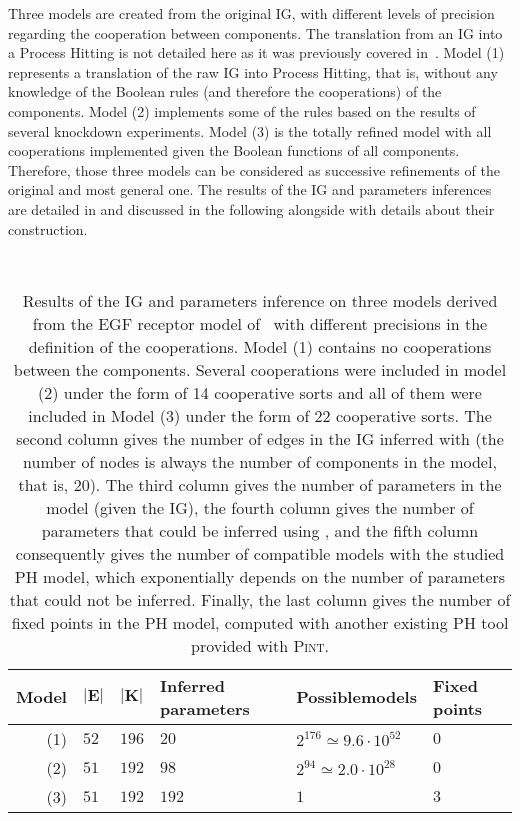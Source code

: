 Three models are created from the original IG, with different levels of precision regarding the cooperation between components.
The translation from an IG into a Process Hitting is not detailed here as it was previously covered in~\cite{PMR10-TCSB}.
Model (1) represents a translation of the raw IG into Process Hitting, that is,
without any knowledge of the Boolean rules (and therefore the cooperations) of the components.
Model (2) implements some of the rules based on the results of several knockdown experiments.
Model (3) is the totally refined model with all cooperations implemented given the Boolean functions of all components.
Therefore, those three models can be considered as successive refinements of the original and most general one.
The results of the IG and parameters inferences are detailed in 
and discussed in the following alongside with details about their construction.

\begin{table}[ht]
~\hfill%
  \begin{tabular}{r|l|l|m{2cm}|m{2.5cm}|m{1.5cm}}
    \textbf{Model} & $\mathbf{|E|}$ & $\mathbf{|K|}$ & \textbf{Inferred parameters} & \textbf{Possible\newline models} & \textbf{Fixed points}
  \\\hline\hline
    (1) & $52$ & $196$ & $20$ & $2^{176}\simeq 9.6\cdot10^{52}$ & $0$   %
  \\\hline
    (2) & $51$ & $192$ & $98$ & $2^{94}\simeq 2.0\cdot10^{28}$ & $0$    %
  \\\hline
    (3) & $51$ & $192$ & $192$ & $1$ & $3$                              %
  \\\hline
  \end{tabular}
\hfill~%
  \caption{%
  Results of the IG and parameters inference on three models
  derived from the EGF receptor model of~\cite{Sahin09}
  with different precisions in the definition of the cooperations.
  Model (1) contains no cooperations between the components.
  Several cooperations were included in model (2) under the form of 14 cooperative sorts
  and all of them were included in Model (3) under the form of 22 cooperative sorts.
  The second column gives the number of edges in the IG inferred with 
  (the number of nodes is always the number of components in the model, that is, 20).
  The third column gives the number of parameters in the model (given the IG),
  the fourth column gives the number of parameters that could be inferred using ,
  and the fifth column consequently gives the number of compatible models with the studied PH model,
  which exponentially depends on the number of parameters that could not be inferred.
  Finally, the last column gives the number of fixed points in the PH model,
  computed with another existing PH tool provided with \textsc{Pint}.
  }
  \label{tb:egfr20}
\end{table}

